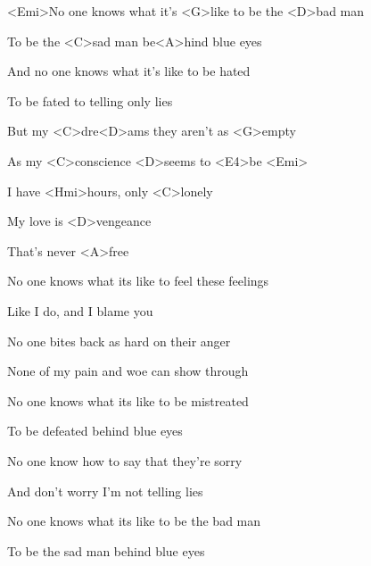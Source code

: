 

\zs
<Emi>No one knows what it's <G>like
to be the <D>bad man

To be the <C>sad man
be<A>hind blue eyes

And no one knows
what it's like to be hated

To be fated to telling only lies
\ks

\zr
But my <C>dre<D>ams they aren't as <G>empty

As my <C>conscience <D>seems to <E4>be <Emi>

I have <Hmi>hours, only <C>lonely

My love is <D>vengeance

That's never <A>free
\kr

\zs
No one knows what its like
to feel these feelings

Like I do, and I blame you

No one bites back as hard on their anger

None of my pain and woe can show through
\ks

\zr \kr

\zs
No one knows what its like
to be mistreated

To be defeated behind blue eyes

No one know how to say that they're sorry

And don't worry I'm not telling lies
\ks

\zr \kr

\zs
No one knows what its like
to be the bad man

To be the sad man
behind blue eyes
\ks

\kp
